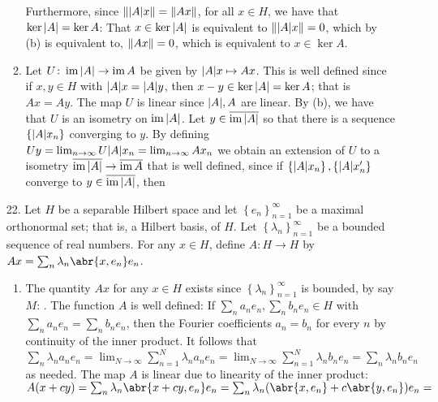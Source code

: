 \documentclass[11pt,leqno]{article}
\theoremstyle{plain}
\theoremstyle{definition}
\numberwithin{equation}{section}
\numberwithin{lem}{section}
\newcommand{\cbr}[1]{\left\{#1\right\}}
\DeclareMathOperator{\im}{im}
\begin{document}
\begin{enumerate}
\begin{enumerate}
        Furthermore, since $\norm{\abs{A}x} = \norm{Ax}$, for all $x\in H$, we have that $\ker \abs{A} = \ker A$: That $x\in \ker \abs{A}$ is equivalent to $\norm{\abs{A}x} = 0$, which by (b) is equivalent to, $\norm{Ax} = 0$, which is equivalent to $x\in \ker A$.
        \item Let $U\colon \im \abs{A}\to \im A$ be given by $\abs{A}x\mapsto Ax$. This is well defined since if $x,y\in H$ with $\abs{A}x = \abs{A}y$, then $x-y\in \ker \abs{A} = \ker A$; that is $Ax = Ay$. The map $U$ is linear since $\abs{A},A$ are linear. By (b), we have that $U$ is an isometry on $\im \abs{A}$. Let $y\in \overline{\im \abs{A}}$ so that there is a sequence $\cbr{\abs{A}x_n}$ converging to $y$. By defining $Uy = \lim_{n\to\infty}U\abs{A}x_n = \lim_{n\to\infty}Ax_n$ we obtain an extension of $U$ to a isometry $\overline{\im \abs{A}}\to\overline{\im A}$ that is well defined, since if $\cbr{\abs{A}x_n},\cbr{\abs{A}x^\prime_n}$ converge to $y\in\overline{\im \abs{A}}$, then 
    \end{enumerate}
    \item[22.] Let $H$ be a separable Hilbert space and let $\cbr{e_n}_{n=1}^\infty$ be a maximal orthonormal set; that is, a Hilbert basis, of $H$. Let $\cbr{\lambda_n}_{n=1}^\infty$ be a bounded sequence of real numbers. For any $x\in H$, define $A\colon H\to H$ by $Ax= \sum_n\lambda_n\abr{x,e_n}e_n$.
    \begin{enumerate}
      \item The quantity $Ax$ for any $x\in H$ exists since $\cbr{\lambda_n}_{n=1}^\infty$ is bounded, by say $M$: . The function $A$ is well defined: If $\sum_n a_ne_n ,\sum_n b_ne_n\in H$ with $\sum_n a_ne_n =\sum_n b_ne_n$, then the Fourier coefficients $a_n = b_n$ for every $n$ by continuity of the inner product. It follows that $\sum_n\lambda_na_ne_n  = \lim_{N\to\infty} \sum_{n=1}^N\lambda_na_ne_n = \lim_{N\to\infty} \sum_{n=1}^N\lambda_nb_ne_n = \sum_n\lambda_nb_ne_n$ as needed. The map $A$ is linear due to linearity of the inner product: $A(x+cy) = \sum_n\lambda_n\abr{x+cy,e_n}e_n = \sum_n\lambda_n(\abr{x,e_n} + c\abr{y,e_n})e_n = $
    \end{enumerate}
\end{enumerate}
\end{document}
